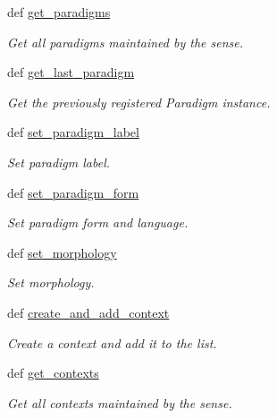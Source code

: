 \begin{DoxyCompactItemize}
def \hyperlink{classlmf_1_1src_1_1core_1_1sense_1_1_sense_a41112d70652f5412eb71eacad72a135a}{get\+\_\+paradigms}
\begin{DoxyCompactList}\small\item\em Get all paradigms maintained by the sense. \end{DoxyCompactList}\item 
def \hyperlink{classlmf_1_1src_1_1core_1_1sense_1_1_sense_abdb32f5050397be1f2147b769fc97f6d}{get\+\_\+last\+\_\+paradigm}
\begin{DoxyCompactList}\small\item\em Get the previously registered Paradigm instance. \end{DoxyCompactList}\item 
def \hyperlink{classlmf_1_1src_1_1core_1_1sense_1_1_sense_ab30230d0322d864c2222ba5471f1a305}{set\+\_\+paradigm\+\_\+label}
\begin{DoxyCompactList}\small\item\em Set paradigm label. \end{DoxyCompactList}\item 
def \hyperlink{classlmf_1_1src_1_1core_1_1sense_1_1_sense_abe2105eb98e2fc6349fa82965ad58261}{set\+\_\+paradigm\+\_\+form}
\begin{DoxyCompactList}\small\item\em Set paradigm form and language. \end{DoxyCompactList}\item 
def \hyperlink{classlmf_1_1src_1_1core_1_1sense_1_1_sense_a4b47011de018711098677f188e973fca}{set\+\_\+morphology}
\begin{DoxyCompactList}\small\item\em Set morphology. \end{DoxyCompactList}\item 
def \hyperlink{classlmf_1_1src_1_1core_1_1sense_1_1_sense_a14ced3b1dd8115d72283d6708d3ce0b5}{create\+\_\+and\+\_\+add\+\_\+context}
\begin{DoxyCompactList}\small\item\em Create a context and add it to the list. \end{DoxyCompactList}\item 
def \hyperlink{classlmf_1_1src_1_1core_1_1sense_1_1_sense_a50f6e0ba88d00c3315b91d3787aa9085}{get\+\_\+contexts}
\begin{DoxyCompactList}\small\item\em Get all contexts maintained by the sense. \end{DoxyCompactList}\item 

\end{DoxyCompactItemize}
